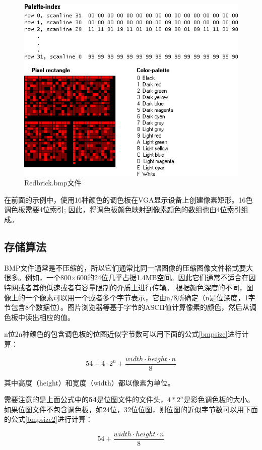 \documentclass[UTF8]{ctexart}
\begin{document}
\begin{figure}[h!]
	\centering
	\includegraphics[width=0.6\linewidth]{bmpexample.png}
	\caption{Redbrick.bmp文件}
	\label{Redbrickbmp}
\end{figure}

在前面的示例中，使用16种颜色的调色板在VGA显示设备上创建像素矩形。16色调色板需要4位索引; 因此，将调色板颜色映射到像素颜色的数组也由4位索引组成。

\subsection{存储算法}

BMP文件通常是不压缩的，所以它们通常比同一幅图像的压缩图像文件格式要大很多。例如，一个800×600的24位几乎占据1.4MB空间。因此它们通常不适合在因特网或者其他低速或者有容量限制的介质上进行传输。
根据颜色深度的不同，图像上的一个像素可以用一个或者多个字节表示，它由n/8所确定（n是位深度，1字节包含8个数据位）。图片浏览器等基于字节的ASCII值计算像素的颜色，然后从调色板中读出相应的值。

n位2n种颜色的包含调色板的位图近似字节数可以用下面的公式\ref{bmpsize}进行计算：

\begin{equation}\label{bmpsize}
    54+4\cdot2^n+\frac{width \cdot height \cdot n}{8}
\end{equation}

其中高度（height）和宽度（width）都以像素为单位。

需要注意的是上面公式中的\textbf{54}是位图文件的文件头，\textbf{$4*2^n$}是彩色调色板的大小。 如果位图文件不包含调色板，如24位，32位位图，则位图的近似字节数可以用下面的公式\ref{bmpsize2}进行计算：

\begin{equation}\label{bmpsize2}
    54+\frac{width \cdot height \cdot n}{8}
\end{equation}
\end{document}

